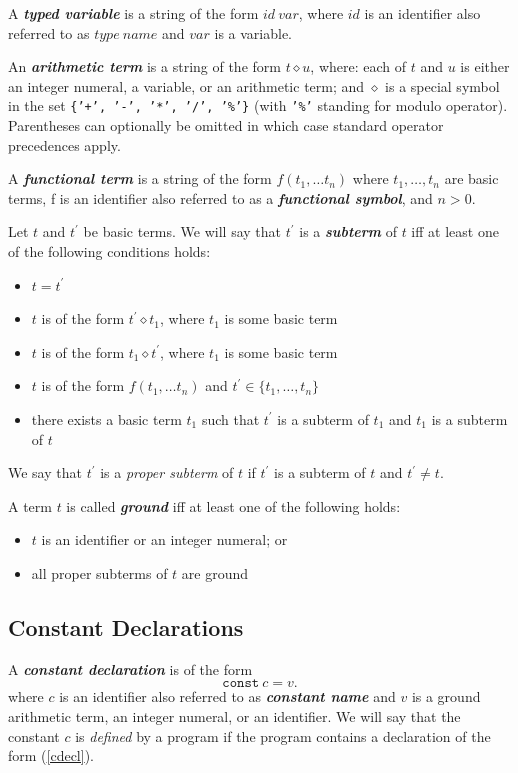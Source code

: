 \documentclass[a4paper,10pt]{article}
\begin{document}
A \textit{\textbf{typed variable}} is a string of the form $id~var$, where $id$ is an identifier also referred to as $type~name$ and $var$ is a variable.

An \textit{\textbf{arithmetic term}} is a string of the form $t \diamond u$, where: each of $t$ and $u$ is either an integer numeral, a variable, or an  arithmetic term; and $\diamond$ is a special symbol in the set \texttt{\{'+', '-', '*', '/', '\%'\}} (with \texttt{'\%'} standing for modulo operator). Parentheses can optionally be omitted in which case standard operator precedences apply. 

A \textbf{\textit{functional term}} is a string of the form $f(t_1,\ldots t_n)$ where $t_1,\dots,t_n$ are basic terms, f  is an identifier also referred to as a \textit{\textbf{functional symbol}}, and $n>0$. 

Let $t$ and $t^\prime$ be basic terms. We will say that $t^\prime$ is a \textbf{\textit{subterm}} of $t$ iff at least one of the following conditions holds:
\begin{itemize}
\item $t  = t^\prime$ 
\item $t$ is of the form $t^\prime \diamond t_1$, where $t_1$ is some basic term
\item $t$ is of the form $t_1 \diamond t^\prime$, where $t_1$ is some basic term
\item $t$ is of the form $f(t_1,\ldots t_n)$ and $t^\prime \in \{t_1,\ldots,t_n\}$
\item there exists a basic term $t_1$ such that $t^\prime$ is a subterm of  $t_1$ and  $t_1$ is a subterm of $t$
\end{itemize}

\noindent
We say that $t^\prime$ is a \textit{proper subterm} of $t$ if $t^\prime$ is a subterm of $t$ and $t^\prime \not= t$. 


A term $t$ is called \textbf{\textit{ground}} iff at least one of the following holds:
\begin{itemize}
\item $t$ is an identifier or an integer numeral; or 
\item all proper subterms of $t$  are ground 
\end{itemize}



\subsection{Constant Declarations}\label{cd}
A \textit{\textbf{constant declaration}} is of the form 
\begin{equation}\label{cdecl}
\texttt{const} ~c = v.
\end{equation}
where  $c$ is an identifier also referred to as  
\textbf{\textit{constant name}}  and $v$ is a ground arithmetic term, an integer numeral, or an identifier. We will say that the constant $c$ is \textit{defined} by a program if the program contains a declaration of the form (\ref{cdecl}).
\end{document}

